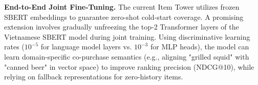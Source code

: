 \documentclass[10pt,conference]{IEEEtran}
\begin{document}
\textbf{End-to-End Joint Fine-Tuning.} The current Item Tower utilizes frozen SBERT embeddings to guarantee zero-shot cold-start coverage. A promising extension involves gradually unfreezing the top-2 Transformer layers of the Vietnamese SBERT model during joint training. Using discriminative learning rates ($10^{-5}$ for language model layers vs. $10^{-3}$ for MLP heads), the model can learn domain-specific co-purchase semantics (e.g., aligning "grilled squid" with "canned beer" in vector space) to improve ranking precision (NDCG@10), while relying on fallback representations for zero-history items.

\clearpage


\end{document}
